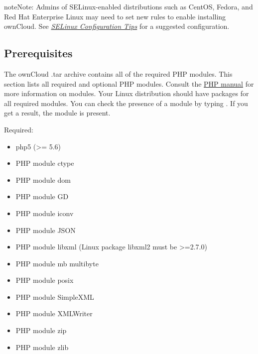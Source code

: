 \documentclass[letterpaper,10pt,english]{sphinxmanual}
\begin{document}
\begin{notice}{note}{Note:}
Admins of SELinux-enabled distributions such as CentOS, Fedora, and
Red Hat Enterprise Linux may need to set new rules to enable installing
ownCloud. See {\hyperref[installation/source_installation:selinux\string-tips\string-label]{\emph{SELinux Configuration Tips}}} for a suggested configuration.
\end{notice}


\subsection{Prerequisites}
\label{installation/source_installation:prerequisites}\label{installation/source_installation:prerequisites-label}
The ownCloud .tar archive contains all of the required PHP modules. This section
lists all required and optional PHP modules.  Consult the \href{http://php.net/manual/en/extensions.php}{PHP manual} for more information on modules.
Your Linux distribution should have packages for all required modules. You can
check the presence of a module by typing .
If you get a result, the module is present.

Required:
\begin{itemize}
\item {} 
php5 (\textgreater{}= 5.6)

\item {} 
PHP module ctype

\item {} 
PHP module dom

\item {} 
PHP module GD

\item {} 
PHP module iconv

\item {} 
PHP module JSON

\item {} 
PHP module libxml (Linux package libxml2 must be \textgreater{}=2.7.0)

\item {} 
PHP module mb multibyte

\item {} 
PHP module posix

\item {} 
PHP module SimpleXML

\item {} 
PHP module XMLWriter

\item {} 
PHP module zip

\item {} 
PHP module zlib

\end{itemize}
\end{document}
